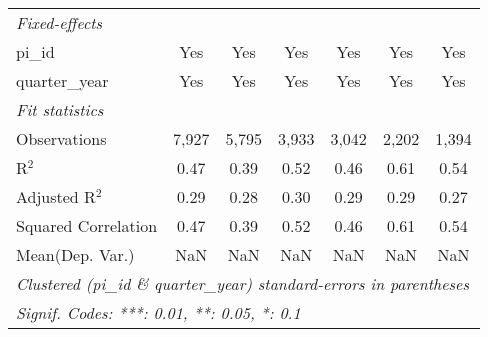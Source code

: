 \begin{tabular}{lcccccc}
   \emph{Fixed-effects}\\
   pi\_id                                                     & Yes            & Yes            & Yes           & Yes           & Yes            & Yes\\  
   quarter\_year                                              & Yes            & Yes            & Yes           & Yes           & Yes            & Yes\\  
   \midrule
   \emph{Fit statistics}\\
   Observations                                               & 7,927          & 5,795          & 3,933         & 3,042         & 2,202          & 1,394\\  
   R$^2$                                                      & 0.47           & 0.39           & 0.52          & 0.46          & 0.61           & 0.54\\  
   Adjusted R$^2$                                             & 0.29           & 0.28           & 0.30          & 0.29          & 0.29           & 0.27\\  
   Squared Correlation                                        & 0.47           & 0.39           & 0.52          & 0.46          & 0.61           & 0.54\\  
Mean(Dep. Var.) & NaN & NaN & NaN & NaN & NaN & NaN \\
   \midrule \midrule
   \multicolumn{7}{l}{\emph{Clustered (pi\_id \& quarter\_year) standard-errors in parentheses}}\\
   \multicolumn{7}{l}{\emph{Signif. Codes: ***: 0.01, **: 0.05, *: 0.1}}\\
\end{tabular}
\par\endgroup
